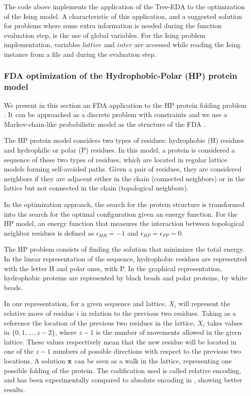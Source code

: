 \documentclass[a4paper]{article}
\begin{document}
The code above implements the application of the Tree-EDA to the
optimization of the Ising model. A characteristic of this
application, and a suggested solution for problems where some extra
information is needed during the function evaluation step, is the
use of global variables. For the Ising problem implementation,
variables \emph{$lattice$} and \emph{$inter$} are accessed while
reading the Ising instance from a file and during the evaluation
step.


\subsubsection{FDA optimization of the Hydrophobic-Polar (HP) protein model}


We present in this section an FDA application to the HP protein
folding problem \cite{Dill:1985}. It can be approached as
 a discrete problem with constraints and we use a Markov-chain-like probabilistic model
as the structure of the FDA
\cite{Santana_et_al:2004,Santana_et_al:2008a}.


 The HP protein model \cite{Dill:1985} considers two types of
residues: hydrophobic (H)  residues  and   hydrophilic or polar (P)
residues. In this model, a protein is considered a sequence of   these two types of
residues, which are located in regular lattice models forming
self-avoided paths. Given a pair of residues, they are considered
neighbors if they are adjacent  either in the chain  (connected
neighbors) or  in the lattice but  not connected in the chain
(topological neighbors).

In the optimization approach, the search for the protein structure
is transformed into the search for the optimal configuration given
an energy function.  For the HP model, an energy function that
measures the interaction
  between topological  neighbor residues is defined  as  $\epsilon_{HH}=-1$ and
  $\epsilon_{HP}=\epsilon_{PP}=0$.

  The HP problem consists of
  finding the solution that minimizes the total energy. In the linear representation of the sequence,
  hydrophobic residues are represented with the letter H and polar ones, with P. In the graphical representation, hydrophobic proteins are
  represented  by black beads and polar proteins, by white
  beads.

In our representation, for a
 given sequence and lattice,  $X_i$ will represent
 the relative move of residue $i$ in relation to the previous two
 residues.  Taking as a reference the location of the previous two
 residues in the lattice, $X_i$ takes values in $\{0,1, \ldots,
 z-2\}$, where $z-1$ is the number of movements allowed in  the given
 lattice. These
 values respectively mean that the new residue will be located
 in one of the $z-1$ numbers of possible directions with respect to the
 previous two locations.  A  solution  ${\bf{x}}$ can be seen as  a walk in the lattice,
 representing one possible folding of the protein. The codification
 used is called relative encoding, and has been experimentally compared to absolute
 encoding in \cite{Krasnogor_et_al:1999}, showing better results.
\end{document}
